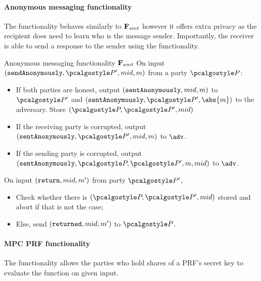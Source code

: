 \documentclass[runningheads,10pt]{llncs}
\numberwithin{equation}{section}
\begin{document}
\paragraph{Anonymous messaging functionality}
The functionality behaves similarly to $\mathbf{F}_{{smt}}$ however it offers extra
privacy as the recipient does need to learn who is the message sender. Importantly, the
receiver is able to send a response to the sender using the functionality.

\begin{funcbox}{Anonymous messaging functionality $\mathbf{F}_{{amt}}$} On input
  $(\sendAnonymously, \party', mid, m)$ from a party $\party$:
  \begin{itemize}
  \item If both parties are honest, output $(\mathtt{sentAnonymously}, mid, m)$ to $\party'$
    and $(\sentAnonymously, \party', \abs{m})$ to the adversary. Store $(\party, \party', mid)$
  \item If the receiving party is corrupted, output $(\sentAnonymously,
    \party', mid, m)$ to $\adv$.
  \item If the sending party is corrupted, output $(\sentAnonymously, \party,
    \party', m, mid)$ to $\adv$.
  \end{itemize}
  On input $(\mathtt{return}, mid, m')$ from party $\party'$,
  \begin{itemize}
  \item Check whether there is $(\party, \party', mid)$ stored and abort if that is not
    the case;
  \item Else, send $(\mathtt{returned}, mid, m')$ to $\party$.
  \end{itemize}
\end{funcbox}
\paragraph{MPC PRF functionality}
The functionality allows the parties who hold shares of a PRF's secret key to
evaluate the function on given input.
\end{document}
